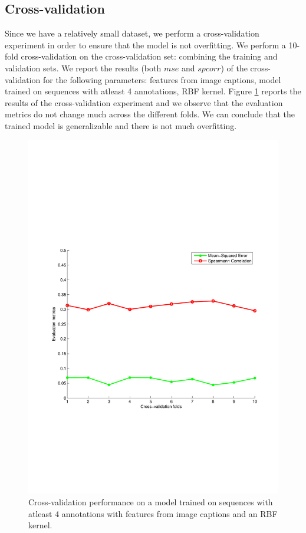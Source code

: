 \documentclass[sigconf]{acmart}
\begin{document}
\subsection{Cross-validation}
\label{cross-val}
Since we have a relatively small dataset, we perform a cross-validation experiment in order to ensure that the model is not overfitting.
We perform a 10-fold cross-validation on the cross-validation set: combining the training and validation sets.
We report the results (both $mse$ and $spcorr$) of the cross-validation for the following parameters: features from image captions, model trained on sequences with atleast 4 annotations, RBF kernel.
Figure \ref{cross-val} reports the results of the cross-validation experiment and we observe that the evaluation metrics do not change much across the different folds.
We can conclude that the trained model is generalizable and there is not much overfitting.

\begin{figure}[h]	  
  \centering
    \includegraphics[width=0.8\columnwidth]{figures/cross-val.pdf}
		\caption{Cross-validation performance on a model trained on sequences with atleast 4 annotations with features from image captions and an RBF kernel.}
    \label{cross-val}
\end{figure}
\end{document}
